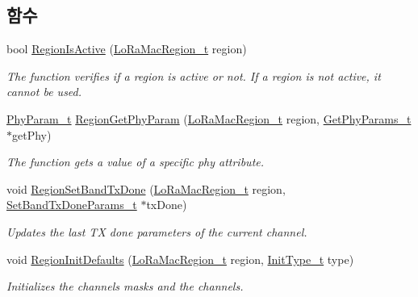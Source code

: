 \subsection*{함수}
\begin{DoxyCompactItemize}
\item 
bool \mbox{\hyperlink{group___r_e_g_i_o_n_ga3e5cf2322f71f8f9973718024b6fb782}{Region\+Is\+Active}} (\mbox{\hyperlink{group___l_o_r_a_m_a_c_ga80c48efda9ae02e14b58160d34a798dd}{Lo\+Ra\+Mac\+Region\+\_\+t}} region)
\begin{DoxyCompactList}\small\item\em The function verifies if a region is active or not. If a region is not active, it cannot be used. \end{DoxyCompactList}\item 
\mbox{\hyperlink{group___r_e_g_i_o_n_gaed159b26e5c4677236b6e8677019db30}{Phy\+Param\+\_\+t}} \mbox{\hyperlink{group___r_e_g_i_o_n_gafbd084611ba512035a6cbe7f3aa5857b}{Region\+Get\+Phy\+Param}} (\mbox{\hyperlink{group___l_o_r_a_m_a_c_ga80c48efda9ae02e14b58160d34a798dd}{Lo\+Ra\+Mac\+Region\+\_\+t}} region, \mbox{\hyperlink{group___r_e_g_i_o_n_gab471483fff904f4f89bbc03f7fc380ab}{Get\+Phy\+Params\+\_\+t}} $\ast$get\+Phy)
\begin{DoxyCompactList}\small\item\em The function gets a value of a specific phy attribute. \end{DoxyCompactList}\item 
void \mbox{\hyperlink{group___r_e_g_i_o_n_gabdd176dcf0b7e7900377b4c1e183613d}{Region\+Set\+Band\+Tx\+Done}} (\mbox{\hyperlink{group___l_o_r_a_m_a_c_ga80c48efda9ae02e14b58160d34a798dd}{Lo\+Ra\+Mac\+Region\+\_\+t}} region, \mbox{\hyperlink{group___r_e_g_i_o_n_gad0524aa0673c0814a71e7a4f9cade3fc}{Set\+Band\+Tx\+Done\+Params\+\_\+t}} $\ast$tx\+Done)
\begin{DoxyCompactList}\small\item\em Updates the last TX done parameters of the current channel. \end{DoxyCompactList}\item 
void \mbox{\hyperlink{group___r_e_g_i_o_n_ga54b1b27a8431cd146b4dc33a894ee6db}{Region\+Init\+Defaults}} (\mbox{\hyperlink{group___l_o_r_a_m_a_c_ga80c48efda9ae02e14b58160d34a798dd}{Lo\+Ra\+Mac\+Region\+\_\+t}} region, \mbox{\hyperlink{group___r_e_g_i_o_n_gaddc73ae10673ec925724e7870363bda9}{Init\+Type\+\_\+t}} type)
\begin{DoxyCompactList}\small\item\em Initializes the channels masks and the channels. \end{DoxyCompactList}\item 

\end{DoxyCompactItemize}
